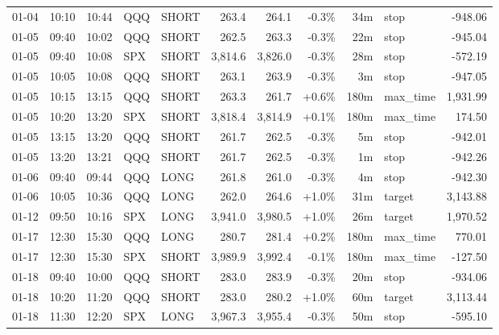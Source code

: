\documentclass[11pt,a4paper,twoside]{article}
\begin{document}
\begin{center}
\begin{longtable}{>{\color{txtmain}}l l l l l r r r r >{\color{txtmain}}l r}
01-04 & 10:10 & 10:44 & QQQ & SHORT & 263.4 & 264.1 & \textcolor{lossred}{-0.3\%} & 34m & stop & \textcolor{lossred}{-948.06} \\
01-05 & 09:40 & 10:02 & QQQ & SHORT & 262.5 & 263.3 & \textcolor{lossred}{-0.3\%} & 22m & stop & \textcolor{lossred}{-945.04} \\
01-05 & 09:40 & 10:08 & SPX & SHORT & 3,814.6 & 3,826.0 & \textcolor{lossred}{-0.3\%} & 28m & stop & \textcolor{lossred}{-572.19} \\
01-05 & 10:05 & 10:08 & QQQ & SHORT & 263.1 & 263.9 & \textcolor{lossred}{-0.3\%} & 3m & stop & \textcolor{lossred}{-947.05} \\
01-05 & 10:15 & 13:15 & QQQ & SHORT & 263.3 & 261.7 & \textcolor{wingreen}{+0.6\%} & 180m & max\_time & \textcolor{wingreen}{1,931.99} \\
01-05 & 10:20 & 13:20 & SPX & SHORT & 3,818.4 & 3,814.9 & \textcolor{wingreen}{+0.1\%} & 180m & max\_time & \textcolor{wingreen}{174.50} \\
01-05 & 13:15 & 13:20 & QQQ & SHORT & 261.7 & 262.5 & \textcolor{lossred}{-0.3\%} & 5m & stop & \textcolor{lossred}{-942.01} \\
01-05 & 13:20 & 13:21 & QQQ & SHORT & 261.7 & 262.5 & \textcolor{lossred}{-0.3\%} & 1m & stop & \textcolor{lossred}{-942.26} \\
01-06 & 09:40 & 09:44 & QQQ & LONG & 261.8 & 261.0 & \textcolor{lossred}{-0.3\%} & 4m & stop & \textcolor{lossred}{-942.30} \\
01-06 & 10:05 & 10:36 & QQQ & LONG & 262.0 & 264.6 & \textcolor{wingreen}{+1.0\%} & 31m & target & \textcolor{wingreen}{3,143.88} \\
01-12 & 09:50 & 10:16 & SPX & LONG & 3,941.0 & 3,980.5 & \textcolor{wingreen}{+1.0\%} & 26m & target & \textcolor{wingreen}{1,970.52} \\
01-17 & 12:30 & 15:30 & QQQ & LONG & 280.7 & 281.4 & \textcolor{wingreen}{+0.2\%} & 180m & max\_time & \textcolor{wingreen}{770.01} \\
01-17 & 12:30 & 15:30 & SPX & SHORT & 3,989.9 & 3,992.4 & \textcolor{lossred}{-0.1\%} & 180m & max\_time & \textcolor{lossred}{-127.50} \\
01-18 & 09:40 & 10:00 & QQQ & SHORT & 283.0 & 283.9 & \textcolor{lossred}{-0.3\%} & 20m & stop & \textcolor{lossred}{-934.06} \\
01-18 & 10:20 & 11:20 & QQQ & SHORT & 283.0 & 280.2 & \textcolor{wingreen}{+1.0\%} & 60m & target & \textcolor{wingreen}{3,113.44} \\
01-18 & 11:30 & 12:20 & SPX & LONG & 3,967.3 & 3,955.4 & \textcolor{lossred}{-0.3\%} & 50m & stop & \textcolor{lossred}{-595.10} \\

\end{longtable}
\end{center}
\end{document}
